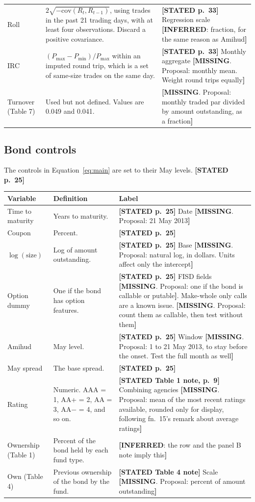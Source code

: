 \documentclass[10pt,a4paper]{article}
\newcommand{\ST}[1]{\textcolor{cst}{\textbf{[STATED #1]}}}
\newcommand{\IN}[1]{\textcolor{cin}{\textbf{[INFERRED}: #1\textbf{]}}}
\newcommand{\MI}[1]{\textcolor{cmi}{\textbf{[MISSING}. Proposal: #1\textbf{]}}}
\begin{document}
\begin{longtable}{@{}P{2.7cm}P{7.2cm}P{7.1cm}@{}}
Roll & $2\sqrt{-\mathrm{cov}(R_t,R_{t-1})}$, using trades in the past 21 trading days, with at least four observations. Discard a positive covariance. & \ST{p.~33} Regression scale \IN{fraction, for the same reason as Amihud}\\
IRC & $(P_{\max}-P_{\min})/P_{\max}$ within an imputed round trip, which is a set of same-size trades on the same day. & \ST{p.~33} Monthly aggregate \MI{monthly mean. Weight round trips equally}\\
Turnover (Table 7) & Used but not defined. Values are 0.049 and 0.041. & \MI{monthly traded par divided by amount outstanding, as a fraction}\\
\bottomrule
\end{longtable}

\subsection{Bond controls}
The controls in Equation~\eqref{eq:main} are set to their May levels. \ST{p.~25}
\begin{longtable}{@{}P{3.2cm}P{6.8cm}P{7cm}@{}}
\toprule
Variable & Definition & Label\\
\midrule\endhead
Time to maturity & Years to maturity. & \ST{p.~25} Date \MI{21 May 2013}\\
Coupon & Percent. & \ST{p.~25}\\
$\log(\text{size})$ & Log of amount outstanding. & \ST{p.~25} Base \MI{natural log, in dollars. Units affect only the intercept}\\
Option dummy & One if the bond has option features. & \ST{p.~25} FISD fields \MI{one if the bond is callable or putable}. Make-whole only calls are a known issue. \MI{count them as callable, then test without them}\\
Amihud & May level. & \ST{p.~25} Window \MI{1 to 21 May 2013, to stay before the onset. Test the full month as well}\\
May spread & The base spread. & \ST{p.~25}\\
Rating & Numeric. AAA = 1, AA+ = 2, AA = 3, AA$-$ = 4, and so on. & \ST{Table 1 note, p.~9} Combining agencies \MI{mean of the most recent ratings available, rounded only for display, following fn.~15's remark about average ratings}\\
Ownership (Table 1) & Percent of the bond held by each fund type. & \IN{the row and the panel B note imply this}\\
Own (Table 4) & Previous ownership of the bond by the fund. & \ST{Table 4 note} Scale \MI{percent of amount outstanding}\\
\bottomrule
\end{longtable}
\end{document}
